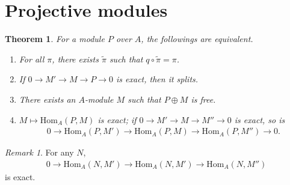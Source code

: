 \documentclass[12pt]{report}
\theoremstyle{plain}
\newtheorem{theorem}{Theorem}[section]
\theoremstyle{remark}
\newtheorem*{remark}{Remark}
\theoremstyle{definition}
\newcommand{\Hom}[3]{\mathrm{Hom}_{#3}(#1,#2)}
\begin{document}
\section{Projective modules}
\begin{theorem}\label{Theorem 2.6.1.}
    For a module $P$ over $A$, the followings are equivalent.
    \begin{enumerate}
        \item For all $\pi$, there exists $\tilde{\pi}$ such that $q\circ \tilde{\pi} = \pi$.
        \begin{figure}[H]
            \centering
        \end{figure}
        \item If $0\rightarrow M'\rightarrow M\rightarrow P\rightarrow 0$ is exact, then it splits.
        \begin{figure}[H]
            \centering
        \end{figure}
        \item There exists an $A$-module $M$ such that $P\oplus M$ is free.
        \item $M\mapsto \Hom{P}{M}{A}$ is exact; if $0\rightarrow M'\rightarrow M\rightarrow M''\rightarrow 0$ is exact, so is
        \begin{align*}
            0\rightarrow \Hom{P}{M'}{A}\rightarrow \Hom{P}{M}{A}\rightarrow \Hom{P}{M''}{A}\rightarrow 0.
        \end{align*}
    \end{enumerate}
\end{theorem}
\begin{remark}
    For any $N$,
    \begin{align*}
        0\rightarrow \Hom{N}{M'}{A}\rightarrow \Hom{N}{M'}{A}\rightarrow \Hom{N}{M''}{A}
    \end{align*}
    is exact.
\end{remark}
\end{document}

